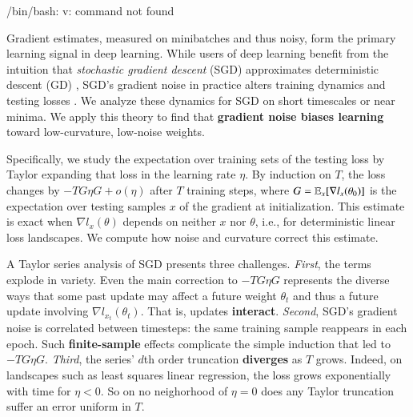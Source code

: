 /bin/bash: v: command not found

  Gradient estimates, measured on minibatches and thus noisy, form the primary
learning signal in deep learning.  While users of deep learning
benefit from the intuition that \emph{stochastic gradient descent} (SGD)
approximates deterministic descent (GD) \citep{bo91,le15}, SGD's gradient noise
in practice alters training dynamics and testing losses \citep{go18,wu20}.  We
analyze these dynamics for SGD on short timescales or near minima.  We apply
this theory to find that \textbf{gradient noise biases
learning} toward low-curvature, low-noise weights.%

  Specifically, we study the expectation over training sets of the
testing loss by Taylor expanding that loss in the learning rate
$\eta$.  By induction on $T$, the loss changes by $-T G\eta G + o(\eta)$
after $T$ training steps, where $G=\mathbb{E}_x[\nabla l_x(\theta_0)]$ is the
expectation over testing samples $x$ of the gradient at initialization.
%
This estimate is exact when $\nabla l_x(\theta)$ depends on neither $x$ nor $\theta$, i.e.,
for deterministic linear loss landscapes.  We compute
how noise and curvature correct this estimate.

  A Taylor series analysis of SGD presents three challenges.
%
\emph{First}, the terms explode in variety.  Even the main
correction to $-T G\eta G$ represents the diverse ways that some past
update may affect a future weight $\theta_t$ and thus a future update
involving $\nabla l_{x_t}(\theta_t)$.  That is, 
updates \textbf{interact}.
%
\emph{Second}, SGD's gradient noise is correlated between timesteps: %
the
same training sample reappears in each epoch.
Such \textbf{finite-sample} effects complicate the simple induction that led to
$-T G\eta G$.
%
\emph{Third}, the series' $d$th order truncation 
\textbf{diverges} as $T$ grows.  Indeed, on landscapes such as least
squares linear regression, the loss grows exponentially with time for
$\eta<0$.  So on no neighorhood of $\eta=0$ does any Taylor truncation suffer
an error uniform in $T$. 

